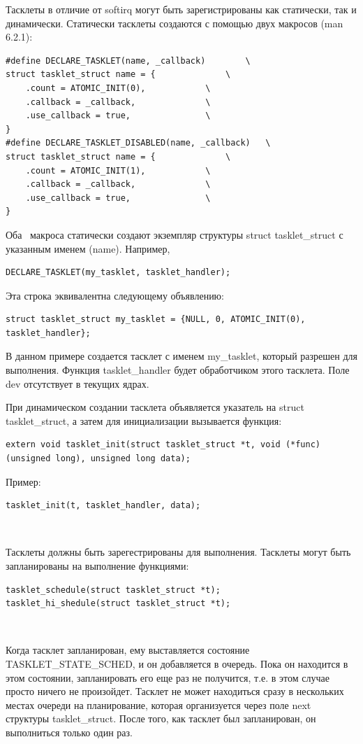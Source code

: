 Тасклеты в отличие от softirq могут быть зарегистрированы как статически, так и динамически. Статически тасклеты создаются с помощью двух макросов (man 6.2.1):

\begin{lstlisting}
#define DECLARE_TASKLET(name, _callback)		\
struct tasklet_struct name = {				\
	.count = ATOMIC_INIT(0),			\
	.callback = _callback,				\
	.use_callback = true,				\
}
#define DECLARE_TASKLET_DISABLED(name, _callback)	\
struct tasklet_struct name = {				\
	.count = ATOMIC_INIT(1),			\
	.callback = _callback,				\
	.use_callback = true,				\
}
\end{lstlisting}

Оба  макроса статически создают экземпляр структуры struct tasklet\_struct с указанным именем (name). Например,

\begin{lstlisting}
DECLARE_TASKLET(my_tasklet, tasklet_handler);
\end{lstlisting}

Эта строка эквивалентна следующему объявлению:
\begin{lstlisting}
struct tasklet_struct my_tasklet = {NULL, 0, ATOMIC_INIT(0), tasklet_handler};
\end{lstlisting}

В данном примере создается тасклет с именем my\_tasklet, который разрешен для выполнения. Функция tasklet\_handler будет обработчиком этого тасклета. Поле dev отсутствует в текущих ядрах.

При динамическом создании тасклета объявляется указатель на
struct tasklet\_struct, а затем для инициализации вызывается функция:
\begin{lstlisting}
extern void tasklet_init(struct tasklet_struct *t, void (*func)(unsigned long), unsigned long data);
\end{lstlisting}

Пример:
\begin{lstlisting}
tasklet_init(t, tasklet_handler, data);
\end{lstlisting}   

Тасклеты должны быть зарегестрированы для выполнения. Тасклеты могут быть запланированы на выполнение функциями:
\begin{lstlisting}
tasklet_schedule(struct tasklet_struct *t); 
tasklet_hi_shedule(struct tasklet_struct *t);
\end{lstlisting}  

Когда тасклет запланирован, ему выставляется состояние TASKLET\_STATE\_SCHED, и он добавляется в очередь. Пока он находится в этом состоянии, запланировать его еще раз не получится, т.е. в этом случае просто ничего не произойдет. Тасклет не может находиться сразу в нескольких местах очереди на планирование, которая организуется через поле next структуры tasklet\_struct. После того, как тасклет был запланирован, он выполниться только один раз.

